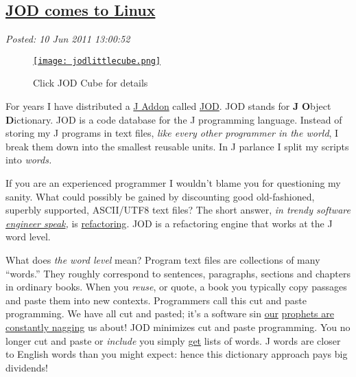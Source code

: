 %

\subsection*{\href{http://bakerjd99.wordpress.com/2011/06/10/jod-comes-to-linux/}{JOD comes to Linux}}


\noindent\emph{Posted: 10 Jun 2011 13:00:52}
\vspace{6pt}

\captionsetup[figure]{labelformat=empty}
\begin{figure}[htbp]
\centering
\href{https://analyzethedatanotthedrivel.org/the-jod-page/}{\texttt{[image: jodlittlecube.png]}}
\caption{Click JOD Cube for details}
\label{fig:jodlittlecube}
\end{figure}

For years I have distributed a
\href{http://www.jsoftware.com/jwiki/Addons}{J Addon} called
\href{http://bakerjd99.wordpress.com/the-jod-page/}{JOD}. JOD stands for
\textbf{J} \textbf{O}bject \textbf{D}ictionary. JOD is a code database
for the J programming language. Instead of storing my J programs in text
files, \emph{like every other programmer in the world}, I break them
down into the smallest reusable units. In J parlance I split my scripts
into \emph{words.}

If you are an experienced programmer I wouldn't blame you for
questioning my sanity. What could possibly be gained by discounting good
old-fashioned, superbly supported, ASCII/UTF8 text files? The short
answer, \emph{in trendy software
\href{http://ee.cleversoul.com/fun/engspeak.html}{engineer speak},} is
\href{http://c2.com/cgi/wiki?WhatIsRefactoring}{refactoring}. JOD is a
refactoring engine that works at the J word level.

What does \emph{the word level} mean? Program text files are collections
of many ``words.'' They roughly correspond to sentences, paragraphs,
sections and chapters in ordinary books. When you \emph{reuse}, or
quote, a book you typically copy passages and paste them into new
contexts. Programmers call this cut and paste programming. We have all
cut and pasted; it's a software sin
\href{http://c2.com/cgi/wiki?CopyAndPasteProgramming}{our} \href{http://c2.com/cgi/wiki?CopyAndPasteProgramming}{prophets
are constantly nagging} us about! JOD minimizes cut and paste
programming. You no longer cut and paste or \emph{include} you simply
\href{https://docs.google.com/document/d/1Vk-PQrdPEISp0SL4eDaGDgg5HpATarPPvXHryC12I8M/edit?hl=en\_US\&pli=1\#}{get}
lists of words. J words are closer to English words than you might
expect: hence this dictionary approach pays big dividends!

